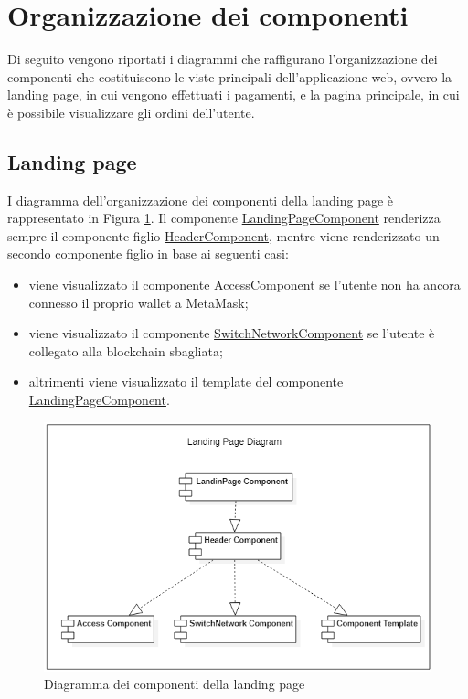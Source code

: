 
\section{Organizzazione dei componenti}
Di seguito vengono riportati i diagrammi che raffigurano l'organizzazione dei componenti che costituiscono le viste principali dell'applicazione web, ovvero la landing page, in cui vengono effettuati i pagamenti, e la pagina principale, in cui è possibile visualizzare gli ordini dell'utente.

\subsection*{Landing page}
I diagramma dell'organizzazione dei componenti della landing page è rappresentato in Figura \ref{fig:components-landing-page}. Il componente \hyperref[sec:landing-component]{LandingPageComponent} renderizza sempre il componente figlio \hyperref[sec:header-component]{HeaderComponent}, mentre viene renderizzato un secondo componente figlio in base ai seguenti casi:
\begin{itemize}
    \item viene visualizzato il componente \hyperref[sec:access-component]{AccessComponent} se l'utente non ha ancora connesso il proprio wallet a MetaMask;
    \item viene visualizzato il componente \hyperref[sec:switch-component]{SwitchNetworkComponent} se l'utente è collegato alla blockchain sbagliata;
    \item altrimenti viene visualizzato il template del componente \hyperref[sec:landing-component]{LandingPageComponent}.
\end{itemize}

\begin{figure}[!h] 
    \centering 
    \includegraphics[width=0.8\columnwidth]{immagini/LandingPageComponentsDiagram.png}
    \caption{Diagramma dei componenti della landing page}
    \label{fig:components-landing-page}
\end{figure}

